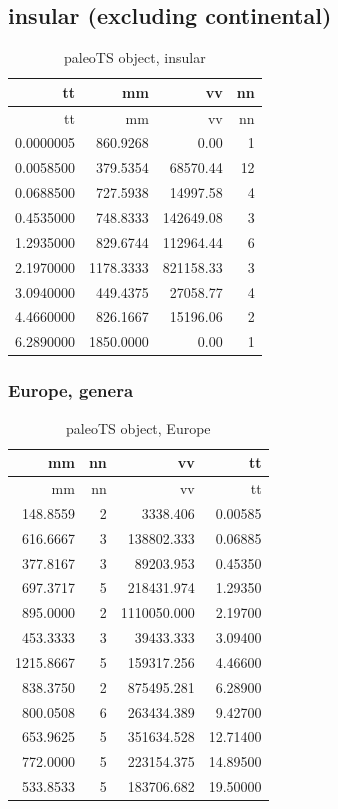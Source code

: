 \FloatBarrier

\subsection*{insular (excluding
	continental)}\label{insular-excluding-continentalAP}


\begin{longtable}[]{@{}rrrr@{}}
	\caption{paleoTS object, insular}
	\label{tab:pTSI}\tabularnewline
	\toprule
	tt & mm & vv & nn\tabularnewline
	\midrule
	\endfirsthead
	\toprule
	tt & mm & vv & nn\tabularnewline
	\midrule
	\endhead
	0.0000005 & 860.9268 & 0.00 & 1\tabularnewline
	0.0058500 & 379.5354 & 68570.44 & 12\tabularnewline
	0.0688500 & 727.5938 & 14997.58 & 4\tabularnewline
	0.4535000 & 748.8333 & 142649.08 & 3\tabularnewline
	1.2935000 & 829.6744 & 112964.44 & 6\tabularnewline
	2.1970000 & 1178.3333 & 821158.33 & 3\tabularnewline
	3.0940000 & 449.4375 & 27058.77 & 4\tabularnewline
	4.4660000 & 826.1667 & 15196.06 & 2\tabularnewline
	6.2890000 & 1850.0000 & 0.00 & 1\tabularnewline
	\bottomrule
\end{longtable}


\FloatBarrier

\subsubsection*{Europe, genera}\label{europe-genera}


\begin{longtable}[]{@{}rrrr@{}}
	\caption{paleoTS object, Europe}
	\label{tab:pTSEu}\tabularnewline
	\toprule
	mm & nn & vv & tt\tabularnewline
	\midrule
	\endfirsthead
	\toprule
	mm & nn & vv & tt\tabularnewline
	\midrule
	\endhead
	148.8559 & 2 & 3338.406 & 0.00585\tabularnewline
	616.6667 & 3 & 138802.333 & 0.06885\tabularnewline
	377.8167 & 3 & 89203.953 & 0.45350\tabularnewline
	697.3717 & 5 & 218431.974 & 1.29350\tabularnewline
	895.0000 & 2 & 1110050.000 & 2.19700\tabularnewline
	453.3333 & 3 & 39433.333 & 3.09400\tabularnewline
	1215.8667 & 5 & 159317.256 & 4.46600\tabularnewline
	838.3750 & 2 & 875495.281 & 6.28900\tabularnewline
	800.0508 & 6 & 263434.389 & 9.42700\tabularnewline
	653.9625 & 5 & 351634.528 & 12.71400\tabularnewline
	772.0000 & 5 & 223154.375 & 14.89500\tabularnewline
	533.8533 & 5 & 183706.682 & 19.50000\tabularnewline
	\bottomrule
\end{longtable}


\FloatBarrier





